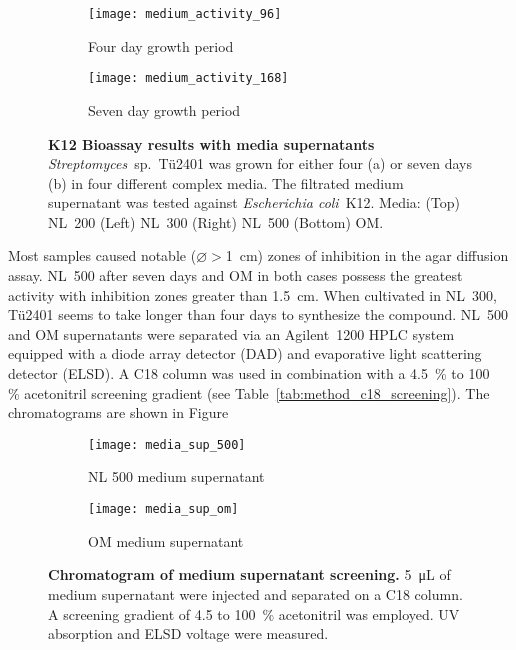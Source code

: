 	\begin{figure}[htbp]
	\centering
		\begin{subfigure}{0.5\textwidth}
			\texttt{[image: medium\_activity\_96]}
			\caption{Four day growth period}
		\end{subfigure}%
		\begin{subfigure}{0.5\textwidth}
			\texttt{[image: medium\_activity\_168]}
			\caption{Seven day growth period}
		\end{subfigure}
		\caption[K12 Bioassay results with media supernatants]{%
			\textbf{K12 Bioassay results with media supernatants}
			\textit{Streptomyces}~sp.~Tü2401 was grown for either four (a) or seven days (b) in four different complex media.
			The filtrated medium supernatant was tested against \textit{Escherichia coli}~K12.
			Media: (Top) NL~200 (Left) NL~300 (Right) NL~500 (Bottom) OM.}
		\label{fig:medium_activity}
	\end{figure}
	
	Most samples caused notable ($\varnothing>$\SI{1}{\centi\meter}) zones of inhibition in the agar diffusion assay.
	NL~500 after seven days and OM in both cases possess the greatest activity with inhibition zones greater than \SI{1.5}{\centi\meter}.
	When cultivated in NL~300, Tü2401 seems to take longer than four days to synthesize the compound.
	NL~500 and OM supernatants were separated via an Agilent~1200 HPLC system equipped with a diode array detector (DAD) and evaporative light scattering detector (ELSD).
	A C18 column was used in combination with a 4.5~\% to 100~ \% acetonitril screening gradient (see Table~\ref{tab:method_c18_screening}).
	The chromatograms are shown in Figure~
	
	\begin{figure}[htbp]
		\centering
		\begin{subfigure}{0.8\textwidth}
			\texttt{[image: media\_sup\_500]}
			\caption{NL 500 medium supernatant}
		\end{subfigure}
		\begin{subfigure}{0.8\textwidth}
			\texttt{[image: media\_sup\_om]}
			\caption{OM medium supernatant}
		\end{subfigure}
		\caption[Chromatogram of medium supernatant screening]{%
			\textbf{Chromatogram of medium supernatant screening.}
			\SI{5}{\micro\liter} of medium supernatant were injected and separated on a C18 column.
			A screening gradient of 4.5 to 100~\% acetonitril was employed.
			UV absorption and ELSD voltage were measured.}
		\label{fig:results_medium_screen}
	\end{figure}
	
